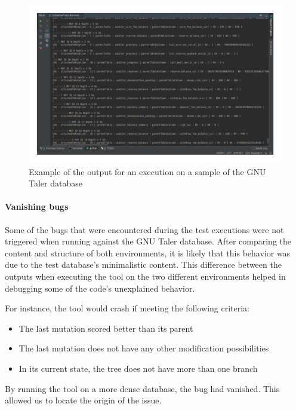 \documentclass{article}
\begin{document}
\begin{empfile}
		\bigskip
		\begin{figure} [h!]
			\includegraphics[width=\textwidth]{sc3.png}
			\caption{Example of the output for an execution on a sample of the GNU Taler database}
		\end{figure}
		\bigskip
		
		\paragraph{Vanishing bugs}		
Some of the bugs that were encountered during the test executions were not triggered when running against the GNU Taler database. After comparing the content and structure of both environments, it is likely that this behavior was due to the test database's minimalistic content.
This difference between the outputs when executing the tool on the two different environments helped in debugging some of the code's unexplained behavior. 

For instance, the tool would crash if meeting the following criteria:
	\begin{itemize}
	\item{The last mutation scored better than its parent}
	\item{The last mutation does not have any other modification possibilities}
	\item{In its current state, the tree does not have more than one branch}
	\end{itemize}
	
By running the tool on a more dense database, the bug had vanished. This allowed us to locate the origin of the issue.



\end{empfile}
\end{document}
